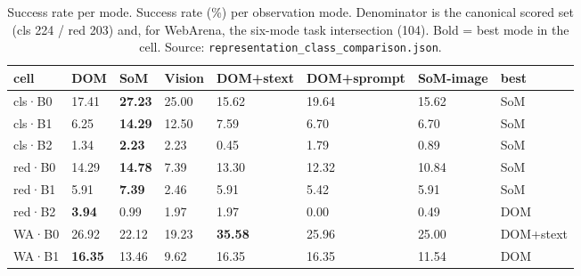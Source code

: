 \begin{table}[tp]
\centering
\caption{Success rate per mode. Success rate (\%) per observation mode. Denominator is the canonical scored set (cls 224 / red 203) and, for WebArena, the six-mode task intersection (104). Bold = best mode in the cell. Source: \texttt{representation\_class\_comparison.json}.}
\label{tab:t01}
\footnotesize
\setlength{\tabcolsep}{3pt}
\begin{tabular}{@{}llllllll@{}}
\toprule
cell & DOM & SoM & Vision & DOM+\allowbreak{}stext & DOM+\allowbreak{}sprompt & SoM-image & best \\
\midrule
cls·B0 & 17.41 & \textbf{27.23} & 25.00 & 15.62 & 19.64 & 15.62 & SoM \\
cls·B1 & 6.25 & \textbf{14.29} & 12.50 & 7.59 & 6.70 & 6.70 & SoM \\
cls·B2 & 1.34 & \textbf{2.23} & 2.23 & 0.45 & 1.79 & 0.89 & SoM \\
red·B0 & 14.29 & \textbf{14.78} & 7.39 & 13.30 & 12.32 & 10.84 & SoM \\
red·B1 & 5.91 & \textbf{7.39} & 2.46 & 5.91 & 5.42 & 5.91 & SoM \\
red·B2 & \textbf{3.94} & 0.99 & 1.97 & 1.97 & 0.00 & 0.49 & DOM \\
WA·B0 & 26.92 & 22.12 & 19.23 & \textbf{35.58} & 25.96 & 25.00 & DOM+\allowbreak{}stext \\
WA·B1 & \textbf{16.35} & 13.46 & 9.62 & 16.35 & 16.35 & 11.54 & DOM \\
\bottomrule
\end{tabular}
\end{table}

